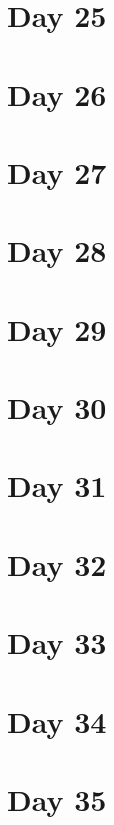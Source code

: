 \documentclass[]{book}
\begin{document}
\hypertarget{day-25}{%
\chapter{Day 25}\label{day-25}}

\hypertarget{day-26}{%
\chapter{Day 26}\label{day-26}}

\hypertarget{day-27}{%
\chapter{Day 27}\label{day-27}}

\hypertarget{day-28}{%
\chapter{Day 28}\label{day-28}}

\hypertarget{day-29}{%
\chapter{Day 29}\label{day-29}}

\hypertarget{day-30}{%
\chapter{Day 30}\label{day-30}}

\hypertarget{day-31}{%
\chapter{Day 31}\label{day-31}}

\hypertarget{day-32}{%
\chapter{Day 32}\label{day-32}}

\hypertarget{day-33}{%
\chapter{Day 33}\label{day-33}}

\hypertarget{day-34}{%
\chapter{Day 34}\label{day-34}}

\hypertarget{day-35}{%
\chapter{Day 35}\label{day-35}}
\end{document}
